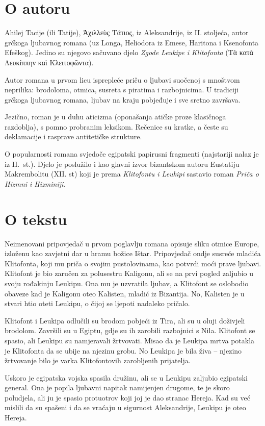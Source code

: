\section*{O autoru}

Ahilej Tacije (ili Tatije), Ἀχιλλεὺς Τάτιος, iz Aleksandrije, iz II. stoljeća, autor grčkoga ljubavnog romana (uz Longa, Heliodora iz Emese, Haritona i Ksenofonta Efeškog). Jedino su njegovo sačuvano djelo \textit{Zgode Leukipe i Klitofonta} (Τὰ κατὰ Λευκίππην καὶ Κλειτοφῶντα).

Autor romana u prvom licu isprepleće priču o ljubavi suočenoj s mnoštvom neprilika: brodoloma, otmica, susreta s piratima i razbojnicima. U tradiciji grčkoga ljubavnog romana, ljubav na kraju pobjeđuje i sve sretno završava.

Jezično, roman je u duhu aticizma (oponašanja atičke proze klasičnoga razdoblja), s pomno probranim leksikom. Rečenice su kratke, a česte su deklamacije i rasprave antitetičke strukture.

O popularnosti romana svjedoče egipatski papirusni fragmenti (najstariji nalaz je iz II.~st.). Djelo je poslužilo i kao glavni izvor bizantskom autoru Eustatiju Makrembolitu (XII. st) koji je prema \textit{Klitofontu i Leukipi} sastavio roman \textit{Priča o Hizmni i Hizminiji}.


\section*{O tekstu}

Neimenovani pripovjedač u prvom poglavlju romana opisuje sliku otmice Europe, izloženu kao zavjetni dar u hramu božice Ištar. Pripovjedač ondje susreće mladića Klitofonta, koji mu priča o svojim pustolovinama, kao potvrdi moći prave ljubavi. Klitofont je bio zaručen za polusestru Kaligonu, ali se na prvi pogled zaljubio u svoju rođakinju Leukipu. Ona mu je uzvratila ljubav, a Klitofont se oslobodio obaveze kad je Kaligonu oteo Kalisten, mladić iz Bizantija. No, Kalisten je u stvari htio oteti Leukipu, o čijoj se ljepoti nadaleko pričalo.

Klitofont i Leukipa odlučili su brodom pobjeći iz Tira, ali su u oluji doživjeli brodolom. Završili su u Egiptu, gdje su ih zarobili razbojnici s Nila. Klitofont se spasio, ali Leukipu su namjeravali žrtvovati. Misao da je Leukipa mrtva potakla je Klitofonta da se ubije na njezinu grobu. No Leukipa je bila živa – njezino žrtvovanje bilo je varka Klitofontovih zarobljenih prijatelja.

Uskoro je egipatska vojska spasila družinu, ali se u Leukipu zaljubio egipatski general. Ona je popila ljubavni napitak namijenjen drugome, te je skoro poludjela, ali ju je spasio protuotrov koji joj je dao stranac Hereja. Kad su već mislili da su spašeni i da se vraćaju u sigurnost Aleksandrije, Leukipu je oteo Hereja.

